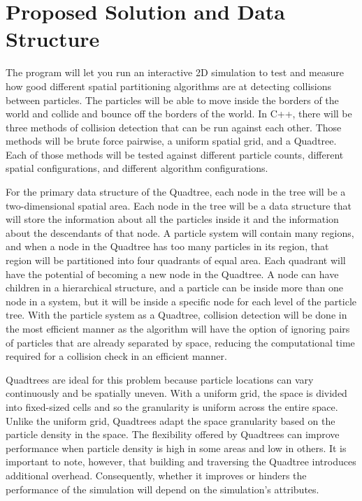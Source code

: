 \section*{Proposed Solution and Data Structure}

The program will let you run an interactive 2D simulation to test and measure how good
different spatial partitioning algorithms are at detecting collisions between particles. The particles will be able
to move inside the borders of the world and collide and bounce off the borders of the world. In
C++, there will be three methods of collision detection that can be run against each other. Those
methods will be brute force pairwise, a uniform spatial grid, and a Quadtree. Each of those methods will
be tested against different particle counts, different spatial configurations, and different algorithm
configurations.

For the primary data structure of the Quadtree, each node in the tree will be a two-dimensional
spatial area. Each node in the tree will be a data structure that will store the information about all the
particles inside it and the information about the descendants of that node. A particle system will contain
many regions, and when a node in the Quadtree has too many particles in its region, that region will be
partitioned into four quadrants of equal area. Each quadrant will have the potential of becoming a new
node in the Quadtree. A node can have children in a hierarchical structure, and a particle can be inside
more than one node in a system, but it will be inside a specific node for each level of the particle tree.
With the particle system as a Quadtree, collision detection will be done in the most efficient manner as
the algorithm will have the option of ignoring pairs of particles that are already separated by space,
reducing the computational time required for a collision check in an efficient manner.

Quadtrees are ideal for this problem because particle locations can vary continuously and be
spatially uneven. With a uniform grid, the space is divided into fixed-sized cells and so the granularity is
uniform across the entire space. Unlike the uniform grid, Quadtrees adapt the space granularity based
on the particle density in the space. The flexibility offered by Quadtrees can improve performance when
particle density is high in some areas and low in others. It is important to note, however, that building
and traversing the Quadtree introduces additional overhead. Consequently, whether it improves or
hinders the performance of the simulation will depend on the simulation's attributes.

